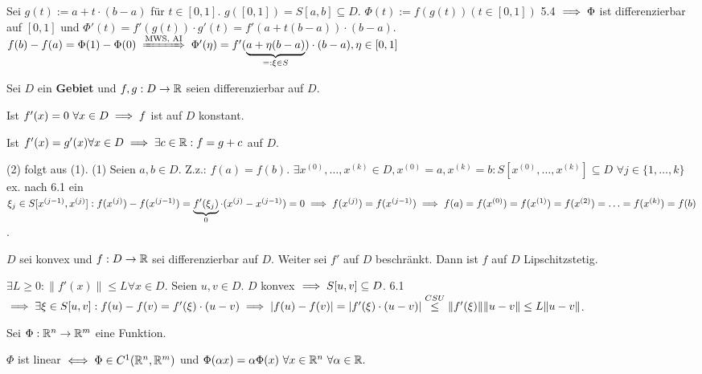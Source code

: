 \documentclass[a4paper,twoside,DIV15,BCOR12mm,chapterprefix=true,headings=twolinechapter]{scrbook}
\begin{document}
\begin{beweis}
Sei $g(t):=a+t\cdot(b-a)$ für $t\in[0,1]$. $g([0,1])=S[a,b]\subseteq D$. $\Phi(t):=f(g(t)) (t \in [0,1])$ 5.4 $\implies \Phi$ ist differenzierbar auf $[0,1]$ und $\Phi'(t) = f'(g(t))\cdot g'(t) = f'(a+t(b-a))\cdot(b-a)$. $f(b)-f(a)=\Phi(1)-\Phi(0) \folgtnach{MWS, AI} \Phi'(\eta) = f'(\underbrace{a+\eta(b-a)}_{=:\xi \in S})\cdot(b-a), \eta \in [0,1]$
\end{beweis}

\begin{folgerungen}
Sei $D$ ein \textbf{Gebiet} und $f,g:D\to\mathbb{R}$ seien differenzierbar auf $D$.
\begin{liste}
\item Ist $f'(x)=0\ \forall x \in D \implies f$ ist auf $D$ konstant.
\item Ist $f'(x)=g'(x) \forall x \in D \implies \exists c \in \mathbb{R}: f=g+c$ auf $D$.
\end{liste}
\end{folgerungen}

\begin{beweis}
(2) folgt aus (1). (1) Seien $a,b \in D$. Z.z.: $f(a)=f(b)$.
$\exists x^{(0)},\ldots,x^{(k)} \in D, x^{(0)}=a, x^{(k)}=b: S[x^{(0)},\ldots,x^{(k)}] \subseteq D$
$\forall j \in \{1,\ldots,k\}$ ex. nach 6.1 ein $\xi_j \in S[x^{(j-1)}, x^{(j)}]:
f(x^{(j)})-f(x^{(j-1)}) = \underbrace{f'(\xi_j)}_0\cdot(x^{(j)}-x^{(j-1)})=0
\implies f(x^{(j)}) = f(x^{(j-1)}) \implies f(a)=f(x^{(0)})=f(x^{(1)})=f(x^{(2)})=\ldots = f(x^{(k)}) = f(b)$.
\end{beweis}

\begin{satz}
$D$ sei konvex und $f:D\to\mathbb{R}$ sei differenzierbar auf $D$. Weiter sei $f'$ auf $D$ beschränkt. Dann ist $f$ auf $D$ Lipschitzstetig.
\end{satz}

\begin{beweis}
$\exists L \ge 0: \|f'(x)\| \le L \forall x \in D$. Seien $u,v \in D$. $D$ konvex $\implies S[u,v]\subseteq D$. 6.1 $\implies \exists\xi\in S[u,v]:f(u)-f(v)=f'(\xi)\cdot(u-v) \implies |f(u)-f(v)|=|f'(\xi)\cdot(u-v)|\stackrel{CSU}{\le}\|f'(\xi)\| \|u-v\| \le L\|u-v\|$.
\end{beweis}

\begin{satz}[Linearität]
Sei $\Phi:\mathbb{R}^n\to\mathbb{R}^m$ eine Funktion.

$\Phi$ ist linear $\iff \Phi \in C^1(\mathbb{R}^n, \mathbb{R}^m)$ und $\Phi(\alpha x)=\alpha\Phi(x)\ \forall x \in \mathbb{R}^n\ \forall \alpha \in \mathbb{R}.$
\end{satz}
\end{document}
